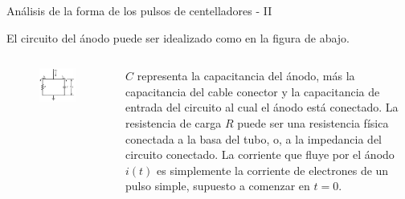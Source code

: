 \documentclass[a4paper,10pt]{beamer}
\begin{document}
\begin{frame}{Análisis de la forma de los pulsos de centelladores - II}
 
 El circuito del ánodo puede ser idealizado como en la figura de abajo.
 
 \begin{columns}[c]

\column{2in}
 \begin{figure}
  \center 
  \includegraphics[scale=0.5]{fig44}
 \end{figure}
 
 \column{2in}
 
 \begin{justify}
  $C$ representa la capacitancia del ánodo, más la capacitancia del cable conector 
  y la capacitancia de entrada del circuito al cual el ánodo está conectado. La 
  resistencia de carga $R$ puede ser una resistencia física conectada a 
  la basa del tubo, o, a la impedancia del circuito conectado. La corriente que 
  fluye por el ánodo $i(t)$ es simplemente la corriente de electrones de un pulso 
  simple, supuesto a comenzar en $t=0$.
 \end{justify}
 \end{columns}
\end{frame}
\end{document}

